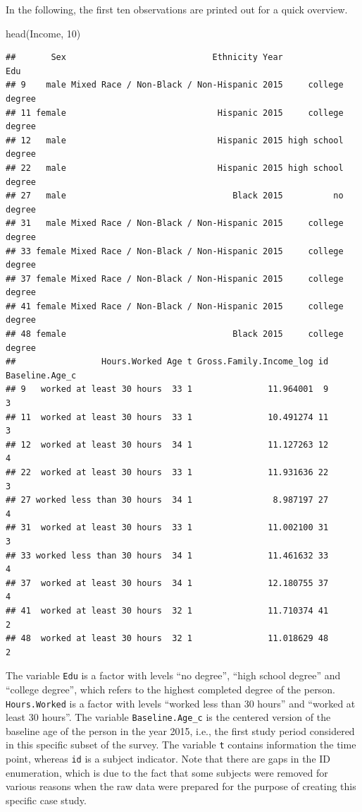 \documentclass[a4paper, preprint, 3p,
authoryear]{elsarticle} %
\newenvironment{Shaded}{\begin{snugshade}}{\end{snugshade}}
\newcommand{\NormalTok}[1]{#1}
\begin{document}
In the following, the first ten observations are printed out for a quick
overview.

\begin{Shaded}
\begin{Highlighting}[]
\NormalTok{head(Income, 10)}
\end{Highlighting}
\end{Shaded}

\begin{verbatim}
##       Sex                             Ethnicity Year                Edu
## 9    male Mixed Race / Non-Black / Non-Hispanic 2015     college degree
## 11 female                              Hispanic 2015     college degree
## 12   male                              Hispanic 2015 high school degree
## 22   male                              Hispanic 2015 high school degree
## 27   male                                 Black 2015          no degree
## 31   male Mixed Race / Non-Black / Non-Hispanic 2015     college degree
## 33 female Mixed Race / Non-Black / Non-Hispanic 2015     college degree
## 37 female Mixed Race / Non-Black / Non-Hispanic 2015     college degree
## 41 female Mixed Race / Non-Black / Non-Hispanic 2015     college degree
## 48 female                                 Black 2015     college degree
##                 Hours.Worked Age t Gross.Family.Income_log id Baseline.Age_c
## 9   worked at least 30 hours  33 1               11.964001  9              3
## 11  worked at least 30 hours  33 1               10.491274 11              3
## 12  worked at least 30 hours  34 1               11.127263 12              4
## 22  worked at least 30 hours  33 1               11.931636 22              3
## 27 worked less than 30 hours  34 1                8.987197 27              4
## 31  worked at least 30 hours  33 1               11.002100 31              3
## 33 worked less than 30 hours  34 1               11.461632 33              4
## 37  worked at least 30 hours  34 1               12.180755 37              4
## 41  worked at least 30 hours  32 1               11.710374 41              2
## 48  worked at least 30 hours  32 1               11.018629 48              2
\end{verbatim}

The variable \texttt{Edu} is a factor with levels ``no degree'', ``high
school degree'' and ``college degree'', which refers to the highest
completed degree of the person. \texttt{Hours.Worked} is a factor with
levels ``worked less than 30 hours'' and ``worked at least 30 hours''.
The variable \texttt{Baseline.Age\_c} is the centered version of the
baseline age of the person in the year 2015, i.e., the first study
period considered in this specific subset of the survey. The variable
\texttt{t} contains information the time point, whereas \texttt{id} is a
subject indicator. Note that there are gaps in the ID enumeration, which
is due to the fact that some subjects were removed for various reasons
when the raw data were prepared for the purpose of creating this
specific case study.
\end{document}
